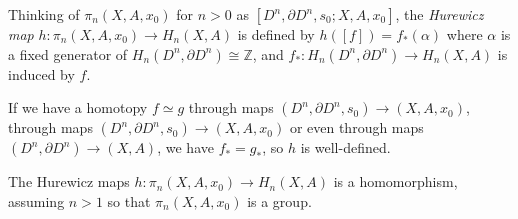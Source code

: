 \begin{definition}
    Thinking of $\pi_n \left( X,A,x_0 \right) $ for
    $n>0$ as
    $\left[ D^{n},\partial D^{n}, s_0 ; X,A,x_0 \right] $, the
    \textit{Hurewicz map} $h \colon
    \pi_n \left( X,A,x_0 \right) \to 
    H_n (X,A)$ is defined by
    $h \left( \left[ f \right]  \right) 
    = f_* \left( \alpha \right) $ where
    $\alpha$ is a fixed generator
    of $H_n \left( D^{n}, \partial D^{n} \right) \cong
    \mathbb{Z}$, and
    $f_* \colon H_n \left( D^{n},\partial D^{n} \right) 
    \to H_n (X,A)$ is induced by $f$.
\end{definition}

If we have a homotopy
    $f \simeq g$ through maps $\left( D^{n},
    \partial D^{n}, s_0\right) \to \left( X,A,x_0 \right) $,
    through maps
    $\left( D^{n},\partial D^{n}, s_0 \right) 
    \to \left( X,A,x_0 \right) $ or even
    through maps $\left( D^{n},\partial D^{n} \right) \to 
    \left( X,A \right) $, we have
    $f_* = g_*$, so $h$ is well-defined.

    \begin{proposition}[]
        The Hurewicz maps $h \colon 
        \pi_n \left( X,A,x_0 \right) \to 
        H_n (X,A)$  is a homomorphism, assuming
        $n>1$ so that $\pi_n \left( X,A,x_0 \right) $ is a group.
    \end{proposition}




